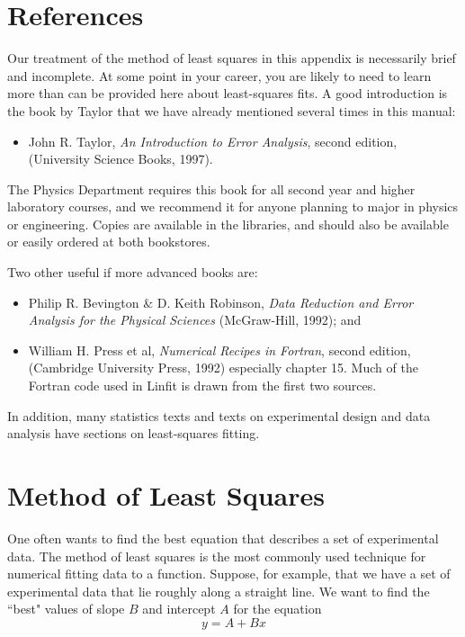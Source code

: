 \section*{References}

Our treatment of the method of least squares in this appendix is
necessarily brief and incomplete.  At some point in your career, you
are likely to need to learn more
than can be provided here about least-squares fits.  
A good introduction is the book by
Taylor that we have already mentioned several times in this manual:

\begin{itemize}
   \item     John R.  Taylor, {\em An Introduction
to Error Analysis}, second edition, (University Science Books, 1997).
\end{itemize}

The Physics Department requires this book for all second year and
higher laboratory courses, and we recommend it for anyone planning to
major in physics or engineering.  Copies are available in the libraries,
and should also be available or easily ordered at both bookstores.

Two other useful if more advanced books are:

\begin{itemize}
\item Philip R.  Bevington \& D. Keith Robinson, {\em Data Reduction and
Error Analysis for the
Physical Sciences} (McGraw-Hill, 1992); and
%
\item  William H. Press et al,
{\em Numerical Recipes in Fortran}, second edition, (Cambridge
University Press, 1992) especially chapter 15.
  Much of the Fortran
code used in Linfit is drawn from the first two sources.
\end{itemize}
In
addition, many statistics texts and texts on experimental design and
data analysis have sections on least-squares fitting.


\section*{Method of Least Squares}

One often wants to find the best equation that describes a set of
experimental data.  The method of least squares 
is the most commonly used technique for 
numerical fitting data to a function.  Suppose, for example, that we
have a set of experimental data that lie roughly along a straight
line.  We want to find the ``best" values of slope $B$ and intercept
$A$
for the equation
\[
y = A + Bx
\]


